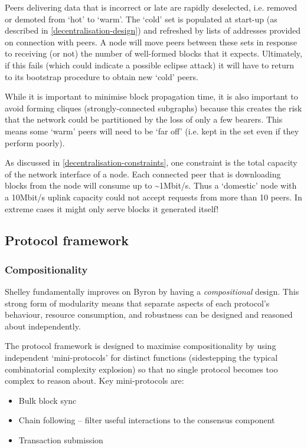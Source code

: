 \documentclass[11pt,a4paper]{article}
\begin{document}
Peers delivering data that is incorrect or late are rapidly deselected,
i.e. removed or demoted from `hot' to `warm'. The `cold' set is
populated at start-up (as described in
\cref{decentralisation-design}) and refreshed by
lists of addresses provided on connection with peers. A node will move
peers between these sets in response to receiving (or not) the number of
well-formed blocks that it expects. Ultimately, if this fails (which
could indicate a possible eclipse attack) it will have to return to its
bootstrap procedure to obtain new `cold' peers.

While it is important to minimise block propagation time, it is also
important to avoid forming cliques (strongly-connected subgraphs)
because this creates the risk that the network could be partitioned by
the loss of only a few bearers. This means some `warm' peers will need
to be `far off' (i.e. kept in the set even if they perform poorly).

As discussed in
\cref{decentralisation-constraints}, one constraint
is the total capacity of the network interface of a node. Each connected
peer that is downloading blocks from the node will consume up to
\textasciitilde{}1Mbit/s. Thus a `domestic' node with a 10Mbit/s uplink
capacity could not accept requests from more than 10 peers. In extreme
cases it might only serve blocks it generated itself!

\subsection{Protocol framework}
\label{protocol-framework}

\subsubsection{Compositionality}
\label{compositionality}

Shelley fundamentally improves on Byron by having a \emph{compositional}
design. This strong form of modularity means that separate aspects of
each protocol's behaviour, resource consumption, and robustness can be
designed and reasoned about independently.

The protocol framework is designed to maximise compositionality by using
independent `mini-protocols' for distinct functions (sidestepping the
typical combinatorial complexity explosion) so that no single protocol
becomes too complex to reason about. Key mini-protocols are:

\begin{itemize}
\item
  Bulk block sync
\item
  Chain following -- filter useful interactions to the consensus
  component
\item
  Transaction submission
\end{itemize}
\end{document}
